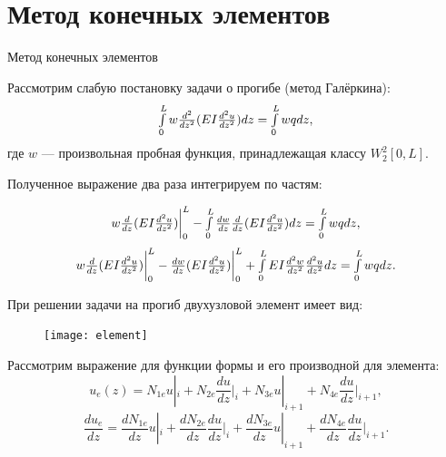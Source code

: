\documentclass[7pt]{beamer}
\numberwithin{equation}{section}
\newcommand*{\Scale}[2][4]{\scalebox{#1}{$#2$}}
\begin{document}
\section{Метод конечных элементов}
\begin{frame}{Метод конечных элементов}
	\begin{block}{Рассмотрим слабую постановку задачи о прогибе (метод Галёркина):}
		\begin{equation}
			\label{beamm}
			\Scale[0.98]{\int\limits_{0}^{L}w\frac{d^{2}}{dz^{2}}(EI\frac{d^{2}u}{dz^{2}})dz=\int\limits_{0}^{L}wqdz,}
		\end{equation}
	где $w$ --- произвольная пробная функция, принадлежащая классу $W_{2}^{2}[0,L]$.
	\end{block}

	Полученное выражение два раза интегрируем по частям: 
	\begin{block}{}
	\[
		\Scale[0.98] {
			w\frac{d}{dz}(EI\frac{d^{2}u}{dz^{2}})\bigg|_0^L-\int\limits_{0}^{L}\frac{dw}{dz}\frac{d}{dz}(EI\frac{d^{2}u}{dz^{2}})dz=\int\limits_{0}^{L}wqdz,
		}
	\]
	\[
		\Scale[0.98] {
			w\frac{d}{dz}(EI\frac{d^{2}u}{dz^{2}})\bigg|_0^L-\frac{dw}{dz}(EI\frac{d^{2}u}{dz^{2}})\bigg|_0^L+\int\limits_{0}^{L}EI\frac{d^{2}w}{dz^{2}}\frac{d^{2}u}{dz^{2}}dz=\int\limits_{0}^{L}wqdz.
		}
	\]
	\end{block}
\end{frame}


\begin{frame}{}
	При решении задачи на прогиб двухузловой элемент имеет вид:
	\begin{figure}[h]
		\centering
		\texttt{[image: element]}
		\label{fig:element}
	\end{figure}
		
	\begin{block}{Рассмотрим выражение для функции формы и его производной для элемента:}
		\[u_e(z)=N_{1e}u|_i + N_{2e}\frac{du}{dz}\Bigr|_i+N_{3e}u|_{i+1} + N_{4e}\frac{du}{dz}\Bigr|_{i+1},\]
		\[\frac{du_e}{dz}=\frac{dN_{1e}}{dz}u|_i+\frac{dN_{2e}}{dz}\frac{du}{dz}\Bigr|_i+\frac{dN_{3e}}{dz}u|_{i+1}+\frac{dN_{4e}}{dz}\frac{du}{dz}\Bigr|_{i+1}.\]
	\end{block}
\end{frame}
\end{document}
